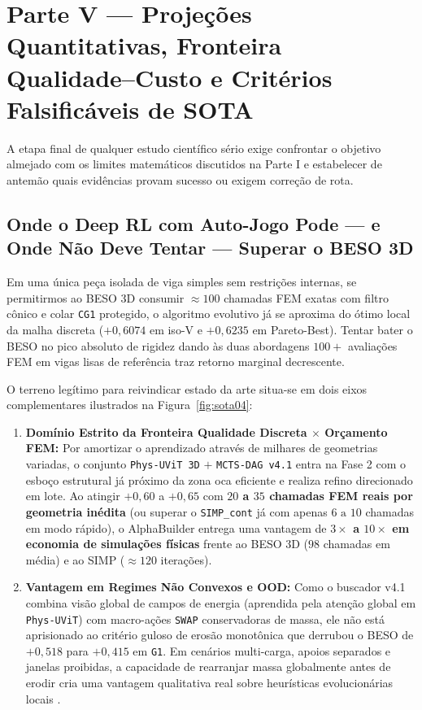 \documentclass[11pt,a4paper]{article}
\renewcommand{\sectionmark}[1]{\markboth{#1}{}}
\begin{document}
\section{Parte V --- Projeções Quantitativas, Fronteira Qualidade--Custo e Critérios Falsificáveis de SOTA}
\sectionmark{Parte V --- Projeções e Critérios de SOTA}

A etapa final de qualquer estudo científico sério exige confrontar o objetivo almejado com os limites matemáticos discutidos na Parte I e estabelecer de antemão quais evidências provam sucesso ou exigem correção de rota.

\subsection{Onde o Deep RL com Auto-Jogo Pode --- e Onde Não Deve Tentar --- Superar o BESO 3D}

Em uma única peça isolada de viga simples sem restrições internas, se permitirmos ao BESO 3D consumir $\approx 100$ chamadas FEM exatas com filtro cônico e colar \texttt{CG1} protegido, o algoritmo evolutivo já se aproxima do ótimo local da malha discreta ($+0{,}6074$ em iso-V e $+0{,}6235$ em Pareto-Best). Tentar bater o BESO no pico absoluto de rigidez dando às duas abordagens $100+$ avaliações FEM em vigas lisas de referência traz retorno marginal decrescente.

O terreno legítimo para reivindicar estado da arte situa-se em dois eixos complementares ilustrados na Figura~\ref{fig:sota04}:
\begin{enumerate}
  \item \textbf{Domínio Estrito da Fronteira Qualidade Discreta $\times$ Orçamento FEM:} Por amortizar o aprendizado através de milhares de geometrias variadas, o conjunto \texttt{Phys-UViT 3D} $+$ \texttt{MCTS-DAG v4.1} entra na Fase 2 com o esboço estrutural já próximo da zona oca eficiente e realiza refino direcionado em lote. Ao atingir $+0{,}60$ a $+0{,}65$ com \textbf{$20$ a $35$ chamadas FEM reais por geometria inédita} (ou superar o \texttt{SIMP\_cont} já com apenas $6\text{ a }10$ chamadas em modo rápido), o AlphaBuilder entrega uma vantagem de \textbf{$3\times$ a $10\times$ em economia de simulações físicas} frente ao BESO 3D ($98$ chamadas em média) e ao SIMP ($\approx 120$ iterações).
  \item \textbf{Vantagem em Regimes Não Convexos e OOD:} Como o buscador v4.1 combina visão global de campos de energia (aprendida pela atenção global em \texttt{Phys-UViT}) \cite{hatamizadeh2022swin} com macro-ações \texttt{SWAP} conservadoras de massa, ele não está aprisionado ao critério guloso de erosão monotônica que derrubou o BESO de $+0{,}518$ para $+0{,}415$ em \texttt{G1}. Em cenários multi-carga, apoios separados e janelas proibidas, a capacidade de rearranjar massa globalmente antes de erodir cria uma vantagem qualitativa real sobre heurísticas evolucionárias locais \cite{padhy2024treetop, garayalde2025mastering, rochefortbeaudoin2025structural}.
\end{enumerate}
\end{document}
